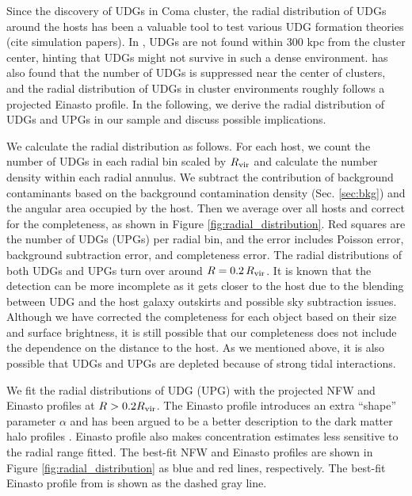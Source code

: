 \documentclass[twocolumn,astrosymb,twocolappendix]{aastex631}
\begin{document}
\begin{CJK*}{UTF8}{gbsn}
Since the discovery of UDGs in Coma cluster, the radial distribution of UDGs around the hosts has been a valuable tool to test various UDG formation theories (cite simulation papers). In \citet{vanDokkum2015}, UDGs are not found within 300 kpc from the cluster center, hinting that UDGs might not survive in such a dense environment. \citet{vdBurg2016} has also found that the number of UDGs is suppressed near the center of clusters, and the radial distribution of UDGs in cluster environments roughly follows a projected Einasto \citep{Einasto1965} profile. In the following, we derive the radial distribution of UDGs and UPGs in our sample and discuss possible implications.

We calculate the radial distribution as follows. For each host, we count the number of UDGs in each radial bin scaled by $R_{\rm vir}$ and calculate the number density within each radial annulus. We subtract the contribution of background contaminants based on the background contamination density (Sec. \ref{sec:bkg}) and the angular area occupied by the host. Then we average over all hosts and correct for the completeness, as shown in Figure \ref{fig:radial_distribution}. Red squares are the number of UDGs (UPGs) per radial bin, and the error includes Poisson error, background subtraction error, and completeness error. The radial distributions of both UDGs and UPGs turn over around $R=0.2\,R_{\rm vir}$. It is known that the detection can be more incomplete as it gets closer to the host due to the blending between UDG and the host galaxy outskirts and possible sky subtraction issues. Although we have corrected the completeness for each object based on their size and surface brightness, it is still possible that our completeness does not include the dependence on the distance to the host. As we mentioned above, it is also possible that UDGs and UPGs are depleted because of strong tidal interactions. 

We fit the radial distributions of UDG (UPG) with the projected NFW and Einasto profiles at $R > 0.2 R_{\rm vir}$. The Einasto profile introduces an extra ``shape'' parameter $\alpha$ and has been argued to be a better description to the dark matter halo profiles \citep[e.g.,][]{Navarro2004,Gao2008,Navarro2010,Dutton2014}. Einasto profile also makes concentration estimates less sensitive to the radial range fitted. The best-fit NFW and Einasto profiles are shown in Figure \ref{fig:radial_distribution} as blue and red lines, respectively. The best-fit Einasto profile from \citet{vdBurg2016} is shown as the dashed gray line.


\end{CJK*}
\end{document}
